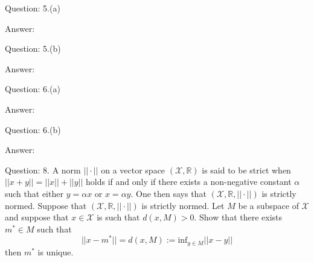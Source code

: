 \documentclass[a4paper]{article}
\begin{document}
\begin{qalist}
%			
		\item[Question: 5.(a)] \setcounter{equation}{0}
		\item[Answer:] 	
		\item[Question: 5.(b)] \setcounter{equation}{0}
		\item[Answer:] 	
		\item[Question: 6.(a)] \setcounter{equation}{0}
		\item[Answer:] 	
		\item[Question: 6.(b)] \setcounter{equation}{0}
		\item[Answer:] 	
		\item[Question: 8.] \setcounter{equation}{0} A norm $||\cdot||$ on a vector space $(\mathcal{X}, \mathbb{R})$ is said to be strict when $||x+y|| = ||x|| + ||y||$ holds if and only if there exists a non-negative constant $\alpha$ such that either $y = \alpha x$ or $x = \alpha y$. One then says that $(\mathcal{X}, \mathbb{R}, ||\cdot||)$ is strictly normed. Suppose that $(\mathcal{X}, \mathbb{R}, ||\cdot||)$ is strictly normed. Let $M$ be a subspace of $\mathcal{X}$ and suppose that $x \in \mathcal{X}$ is such that $d(x,M) > 0$. Show that there exists ${m}^{*} \in M$ such that \[||x - {m}^{*}|| = d(x,M) := \text{inf}_{y\in M} ||x-y||\] then ${m}^{*}$ is unique.

\end{qalist}
\end{document}
